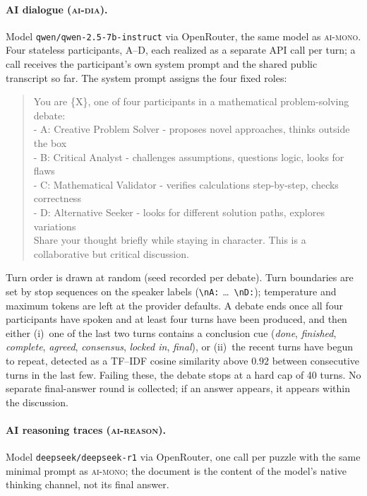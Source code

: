 \documentclass[11pt]{article}
\newcommand{\cellad}{\textsc{ai-dia}}
\newcommand{\cellam}{\textsc{ai-mono}}
\newcommand{\cellrt}{\textsc{ai-reason}}
\begin{document}
\paragraph{AI dialogue (\cellad{}).} Model
\texttt{qwen/qwen-2.5-7b-instruct} via OpenRouter, the same model as
\cellam{}. Four stateless participants, A--D, each realized as a separate
API call per turn; a call receives the participant's own system prompt and the
shared public transcript so far. The system prompt assigns the four fixed
roles:

\begin{quote}\scriptsize\ttfamily\raggedright
You are \{X\}, one of four participants in a mathematical problem-solving
debate:\\
- A: Creative Problem Solver - proposes novel approaches, thinks outside the
box\\
- B: Critical Analyst - challenges assumptions, questions logic, looks for
flaws\\
- C: Mathematical Validator - verifies calculations step-by-step, checks
correctness\\
- D: Alternative Seeker - looks for different solution paths, explores
variations\\
Share your thought briefly while staying in character. This is a
collaborative but critical discussion.
\end{quote}

\noindent Turn order is drawn at random (seed recorded per debate). Turn
boundaries are set by stop sequences on the speaker labels
(\texttt{\textbackslash nA:} \ldots\ \texttt{\textbackslash nD:}); temperature
and maximum tokens are left at the provider defaults. A debate ends once all
four participants have spoken and at least four turns have been produced, and
then either (i)~one of the last two turns contains a conclusion cue
(\emph{done}, \emph{finished}, \emph{complete}, \emph{agreed}, \emph{consensus},
\emph{locked in}, \emph{final}), or (ii)~the recent turns have begun to repeat,
detected as a TF--IDF cosine similarity above $0.92$ between consecutive turns
in the last few. Failing these, the debate stops at a hard cap of 40 turns. No
separate final-answer round is collected; if an answer appears, it appears
within the discussion.

\paragraph{AI reasoning traces (\cellrt{}).} Model
\texttt{deepseek/deepseek-r1} via OpenRouter, one call per puzzle with the
same minimal prompt as \cellam{}; the document is the content of the model's
native thinking channel, not its final answer.
\end{document}
